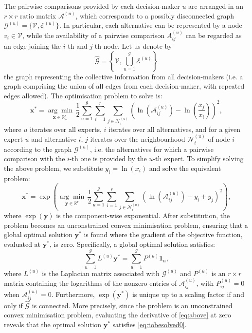 \documentclass[journal]{IEEEtran}
\begin{document}
The pairwise comparisons provided by each decision-maker $u$ are arranged in an $r \times r$ ratio matrix $\mathcal{A}^{(u)}$, which corresponds to a possibly disconnected graph $\mathcal{G}^{(u)}=\{\mathcal{V},\mathcal{E}^{(u)}\}$.
In particular, each alternative can be represented by a node $v_i\in \mathcal{V}$, while the availability of a pairwise comparison $A^{(u)}_{ij}$ can be regarded as an edge joining the $i$-th and $j$-th node.
Let us denote by
\[
\widehat{\mathcal{G}}=\left\{\mathcal{V},\bigcup_{u=1}^g \mathcal{E}^{(u)}\right\}
\]
the graph representing the collective information from all decision-makers (i.e. a graph comprising the union of all edges from each decision-maker, with repeated edges allowed). The optimisation problem to solve is:
\begin{equation}
\label{eq:above1}
{\bm x}^*=\underset{{\bm x}\in\mathbb{R}^r_+}{\arg\min}\,\frac{1}{2}\sum_{u=1}^g\sum_{i=1}^r\sum_{j\in\mathcal{N}^{(u)}_i}\left(
\ln\left(\mathcal{A}_{ij}^{(u)}\right)-\ln\left(\frac{x_j}{x_i}\right)\right)^2,
\end{equation}
where $u$ iterates over all experts, $i$ iterates over all alternatives, and for a given expert $u$ and alternative $i$, $j$ iterates over the neighbourhood $\mathcal{N}^{(u)}_i$ of node $i$ according to the graph $\mathcal{G}^{(u)}$, i.e. the alternatives for which a pairwise comparison with the $i$-th one is provided by the $u$-th expert. To simplify solving the above problem, we substitute $y_i=\ln(x_i)$ and solve the equivalent problem:
\begin{equation}
\label{eq:above}
{\bm x}^*=\exp\left(\underset{{\bm y}\in\mathbb{R}^r}{\arg\min}\,\frac{1}{2}\sum_{u=1}^g\sum_{i=1}^r\sum_{j\in\mathcal{N}^{(u)}_i}\left(
\ln\left(\mathcal{A}_{ij}^{(u)}\right)-y_i+y_j
\right)^2\right),
\end{equation}
where $\exp({\bm y})$ is the component-wise exponential. After substitution, the problem becomes an unconstrained convex minimisation problem, ensuring that a global optimal solution ${\bm y}^*$ is found where the gradient of the objective function, evaluated at ${\bm y}^*$, is zero. Specifically, a global optimal solution satisfies:
\begin{equation}
\label{eq:tobesolved0}
\sum_{u=1}^g L^{(u)}{\bm y}^{*}=\sum_{u=1}^gP^{(u)}{\bm 1}_n,
\end{equation}
where $L^{(u)}$ is the Laplacian matrix associated with $\mathcal{G}^{(u)}$ and $P^{(u)}$ is an $r \times r$ matrix containing the logarithms of the nonzero entries of $\mathcal{A}_{ij}^{(u)}$, with $P^{(u)}_{ij}=0$ when $\mathcal{A}_{ij}^{(u)}=0$. Furthermore, $\exp({\bm y}^*)$ is unique up to a scaling factor if and only if $\widehat{\mathcal{G}}$ is connected. More precisely, since the problem is an unconstrained convex minimisation problem, evaluating the derivative of \eqref{eq:above} at zero reveals that the optimal solution ${\bm y}^*$ satisfies \eqref{eq:tobesolved0}.
\color{black}
\end{document}
